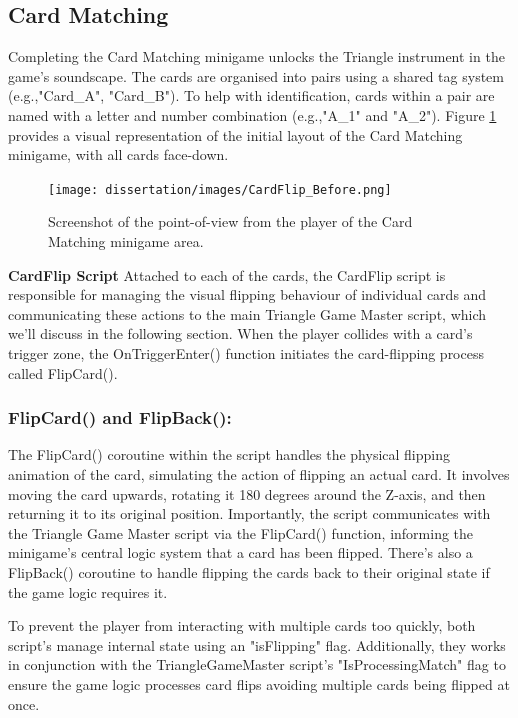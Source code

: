 \documentclass{l4proj}
\begin{document}
\subsection{Card Matching}
Completing the Card Matching minigame unlocks the Triangle instrument in the game's soundscape. The cards are organised into pairs using a shared tag system (e.g.,"Card\_A", "Card\_B"). To help with identification, cards within a pair are named with a letter and number combination (e.g.,"A\_1" and "A\_2"). Figure \ref{fig:card_matching_overview} provides a visual representation of the initial layout of the Card Matching minigame, with all cards face-down.\newline

\begin{figure}[h]
  \centering
  \texttt{[image: dissertation/images/CardFlip\_Before.png]} 

  \caption{Screenshot of the point-of-view from the player of the Card Matching minigame area.}

  \label{fig:card_matching_overview} 
\end{figure}

\textbf{CardFlip Script} \newline
Attached to each of the cards, the CardFlip script is responsible for managing the visual flipping behaviour of individual cards and communicating these actions to the main Triangle Game Master script, which we'll discuss in the following section. When the player collides with a card's trigger zone, the OnTriggerEnter() function initiates the card-flipping process called FlipCard().

\subsubsection{FlipCard() and FlipBack():} The FlipCard() coroutine within the script handles the physical flipping animation of the card, simulating the action of flipping an actual card. It involves moving the card upwards, rotating it 180 degrees around the Z-axis, and then returning it to its original position. Importantly, the script communicates with the Triangle Game Master script via the FlipCard() function, informing the minigame's central logic system that a card has been flipped. There's also a FlipBack() coroutine to handle flipping the cards back to their original state if the game logic requires it.

To prevent the player from interacting with multiple cards too quickly, both script's manage internal state using an "isFlipping" flag. Additionally, they works in conjunction with the TriangleGameMaster script's "IsProcessingMatch" flag to ensure the game logic processes card flips avoiding multiple cards being flipped at once.
\end{document}
